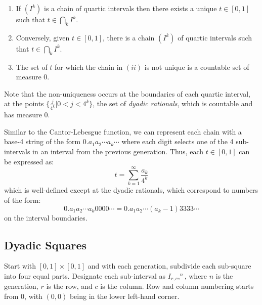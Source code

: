 \documentclass[letterpaper,12pt,fleqn]{article}
\newcommand{\uint}{[0,1]}
\newcommand{\usq}{\uint\times\uint}
\begin{document}
\begin{properties}
\listbreak
\begin{enumerate}
\item If $(I^k)$ is a chain of quartic intervals then there exists a unique
$t\in\uint$ such that $t\in\bigcap_kI^k$.

\item Conversely, given $t\in\uint$, there is a chain $(I^k)$ of quartic
intervals such that $t\in\bigcap_kI^k$.

\item The set of $t$ for which the chain in $(ii)$ is not unique is a countable
set of measure 0.
\end{enumerate}
\end{properties}

Note that the non-uniqueness occurs at the boundaries of each quartic interval,
at the points $\{\frac{j}{4^k}|0<j<4^k\}$, the set of \emph{dyadic rationals},
which is countable and has measure 0.

Similar to the Cantor-Lebesgue function, we can represent each chain with
a base-4 string of the form $0.a_1a_2\cdots a_k\cdots$ where each digit
selects one of the 4 sub-intervals in an interval from the previous generation.
Thus, each $t\in\uint$ can be expressed as:
\[t=\sum_{k=1}^{\infty}\frac{a_k}{4^k}\]
which is well-defined except at the dyadic rationals, which correspond to
numbers of the form:
\[0.a_1a_2\cdots a_k0000\cdots=0.a_1a_2\cdots (a_k-1)3333\cdots\]
on the interval boundaries.

\newpage

\subsection*{Dyadic Squares}

Start with $\usq$ and with each generation, subdivide each sub-square
into four equal parts.  Designate each sub-interval as $I_{r,c},^n$, where $n$ is
the generation, $r$ is the row, and $c$ is the column.  Row and column
numbering starts from 0, with $(0,0)$ being in the lower left-hand corner.

\hspace{0.5in}
\end{document}
